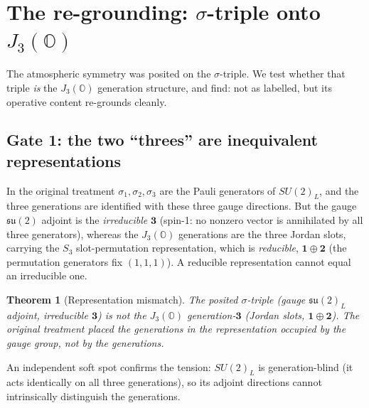 \documentclass[11pt]{article}
\newtheorem{theorem}{Theorem}
\theoremstyle{definition}
\newcommand{\OO}{\mathbb{O}}
\newcommand{\JthreeO}{J_3(\OO)}
\newcommand{\su}{\mathfrak{su}}
\begin{document}
\section{The re-grounding: $\sigma$-triple onto $\JthreeO$}\label{sec:regrounding}

The atmospheric symmetry was posited on the $\sigma$-triple. We test whether that triple \emph{is} the $\JthreeO$ generation structure, and find: not as labelled, but its operative content re-grounds cleanly.

\subsection{Gate 1: the two ``threes'' are inequivalent representations}
In the original treatment $\sigma_1,\sigma_2,\sigma_3$ are the Pauli generators of $SU(2)_L$, and the three generations are identified with these three gauge directions. But the gauge $\su(2)$ adjoint is the \emph{irreducible} $\mathbf{3}$ (spin-1: no nonzero vector is annihilated by all three generators), whereas the $\JthreeO$ generations are the three Jordan slots, carrying the $S_3$ slot-permutation representation, which is \emph{reducible}, $\mathbf 1\oplus\mathbf 2$ (the permutation generators fix $(1,1,1)$). A reducible representation cannot equal an irreducible one.

\begin{theorem}[Representation mismatch]
The posited $\sigma$-triple (gauge $\su(2)_L$ adjoint, irreducible $\mathbf 3$) is not the $\JthreeO$ generation-$\mathbf 3$ (Jordan slots, $\mathbf 1\oplus\mathbf 2$). The original treatment placed the generations in the representation occupied by the \emph{gauge group}, not by the generations.
\end{theorem}

\noindent An independent soft spot confirms the tension: $SU(2)_L$ is generation-blind (it acts identically on all three generations), so its adjoint directions cannot intrinsically distinguish the generations.
\end{document}
